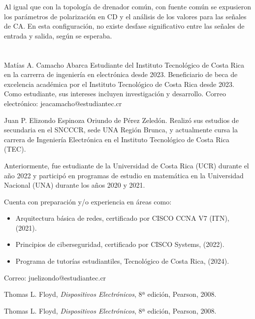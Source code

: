 \documentclass[journal]{IEEEtran}
\begin{document}
Al igual que con la topología de drenador común, con fuente común se expusieron los parámetros de polarización en CD
y el análisis de los valores para las señales de CA. En esta configuración, no existe desfase significativo entre las 
señales de entrada y salida, según se esperaba. 

\appendices
\section{}
\vspace{-1.2cm}
\begin{IEEEbiographynophoto}{Matías A. Camacho Abarca}
        Estudiante del Instituto Tecnológico de Costa Rica en la carrerra de ingeniería en electrónica desde
        2023. Beneficiario de beca de excelencia académica por el Instituto Tecnológico de
        Costa Rica desde 2023. Como estudiante, sus
        intereses incluyen investigación y desarrollo.
        Correo electrónico: jeacamacho@estudiantec.cr
\end{IEEEbiographynophoto}
\vspace{-1.2cm}
\begin{IEEEbiographynophoto}{Juan P. Elizondo Espinoza}
        Oriundo de Pérez Zeledón. Realizó sus estudios de secundaria en el SNCCCR, sede UNA Región Brunca, y actualmente cursa la carrera de Ingeniería Electrónica en el Instituto Tecnológico de Costa Rica (TEC). 
        
        Anteriormente, fue estudiante de la Universidad de Costa Rica (UCR) durante el año 2022 y participó en programas de estudio en matemática en la Universidad Nacional (UNA) durante los años 2020 y 2021. 
        
        Cuenta con preparación y/o experiencia en áreas como:
        \begin{itemize}
            \item Arquitectura básica de redes, certificado por CISCO CCNA V7 (ITN), (2021).
            \item Principios de ciberseguridad, certificado por CISCO Systems, (2022).
            \item Programa de tutorías estudiantiles, Tecnológico de Costa Rica, (2024).
        \end{itemize}
        
        Correo: juelizondo@estudiantec.cr
\end{IEEEbiographynophoto}


\begin{thebibliography}{11}
    Thomas L. Floyd, \emph{Dispositivos Electrónicos}, 8ª edición, Pearson, 2008.
\end{thebibliography}

\begin{thebibliography}{11}
    Thomas L. Floyd, \emph{Dispositivos Electrónicos}, 8ª edición, Pearson, 2008.
\end{thebibliography}
\end{document}
